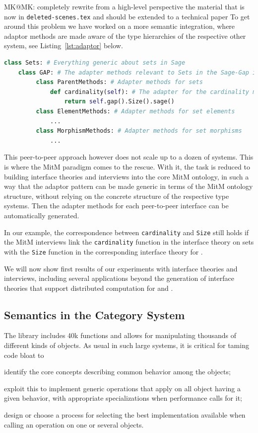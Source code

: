 \begin{newpart}{MK@MK: completely rewrite from a high-level perspective the material that
    is now in \texttt{deleted-scenes.tex} and should be extended to a technical paper}
To get around this problem we have worked on a more semantic integration, where adaptor
methods are made aware of the type hierarchies of the respective other system, see
Listing~\ref{lst:adaptor} below. 
\begin{lstlisting}[language=Python,label=lst:adaptor,
  caption=A Semantic Adaptor Method in \Sage]
class Sets: # Everything generic about sets in Sage
    class GAP: # The adapter methods relevant to Sets in the Sage-Gap interface
         class ParentMethods: # Adapter methods for sets
             def cardinality(self): # The adapter for the cardinality method
                 return self.gap().Size().sage()
         class ElementMethods: # Adapter methods for set elements
             ...
         class MorphismMethods: # Adapter methods for set morphisms
             ...
\end{lstlisting}

This peer-to-peer approach however does not scale up to a dozen of
systems. This is where the MitM paradigm comes to the rescue. With it,
the task is reduced to building interface theories and interviews into
the core MitM ontology, in such a way that the adaptor pattern can be
made generic in terms of the MitM ontology structure, without relying
on the concrete structure of the respective type systems. Then the
adapter methods for each peer-to-peer interface can be automatically
generated.

In our example, the correspondence between \texttt{cardinality} and
\texttt{Size} still holds if the MitM interviews link the
\texttt{cardinality} function in the \Sage interface theory on sets
with the \texttt{Size} function in the corresponding interface theory
for \GAP.

We will now show first results of our experiments with interface
theories and interviews, including several applications beyond the
generation of interface theories that support distributed computation
for \Sage and \GAP.
\end{newpart}

\subsection{Semantics in the \Sage Category System}

The \Sage library includes 40k functions and allows for manipulating
thousands of different kinds of objects. As usual in such large
systems, it is critical for taming code bloat to
\begin{inparaenum}[\em i\rm)]
\item identify the core concepts describing common behavior among the objects;
\item exploit this to implement generic operations that apply on all object having a given
  behavior, with appropriate specializations when performance calls for it;
\item design or choose a process for selecting the best implementation available when
  calling an operation on one or several objects.
\end{inparaenum}

